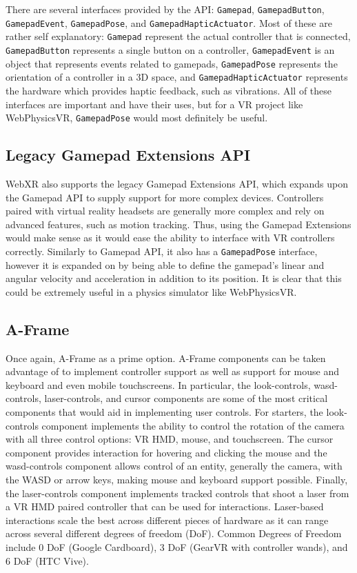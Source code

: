 \documentclass[draftclsnofoot,onecolumn,letterpaper,10pt]{article}
\begin{document}
There are several interfaces provided by the API: \texttt{Gamepad}, \texttt{GamepadButton}, \texttt{GamepadEvent}, \texttt{GamepadPose}, and \texttt{GamepadHapticActuator}. Most of these are rather self explanatory: \texttt{Gamepad} represent the actual controller that is connected, \texttt{GamepadButton} represents a single button on a controller, \texttt{GamepadEvent} is an object that represents events related to gamepads, \texttt{GamepadPose} represents the orientation of a controller in a 3D space, and \texttt{GamepadHapticActuator} represents the hardware which provides haptic feedback, such as vibrations. All of these interfaces are important and have their uses, but for a VR project like WebPhysicsVR, \texttt{GamepadPose} would most definitely be useful.\cite{gamepad1}

\subsection{Legacy Gamepad Extensions API}
WebXR also supports the legacy Gamepad Extensions API, which expands upon the Gamepad API to supply support for more complex devices. Controllers paired with virtual reality headsets are generally more complex and rely on advanced features, such as motion tracking. Thus, using the Gamepad Extensions would make sense as it would ease the ability to interface with VR controllers correctly. Similarly to Gamepad API, it also has a \texttt{GamepadPose} interface, however it is expanded on by being able to define the gamepad's linear and angular velocity and acceleration in addition to its position. It is clear that this could be extremely useful in a physics simulator like WebPhysicsVR.\cite{gamepad2}

\subsection{A-Frame}
Once again, A-Frame as a prime option. A-Frame components can be taken advantage of to implement controller support as well as support for mouse and keyboard and even mobile touchscreens. In particular, the look-controls, wasd-controls, laser-controls, and cursor components are some of the most critical components that would aid in implementing user controls. For starters, the look-controls component implements the ability to control the rotation of the camera with all three control options: VR HMD, mouse, and touchscreen.\cite{aframe7} The cursor component provides interaction for hovering and clicking the mouse and the wasd-controls component allows control of an entity, generally the camera, with the WASD or arrow keys, making mouse and keyboard support possible.\cite{aframe8, aframe9} Finally, the laser-controls component implements  tracked controls that shoot a laser from a VR HMD paired controller that can be used for interactions. Laser-based interactions scale the best across different pieces of hardware as it can range across several different degrees of freedom (DoF). Common Degrees of Freedom include 0 DoF (Google Cardboard), 3 DoF (GearVR with controller wands), and 6 DoF (HTC Vive).\cite{aframe10}
\end{document}
